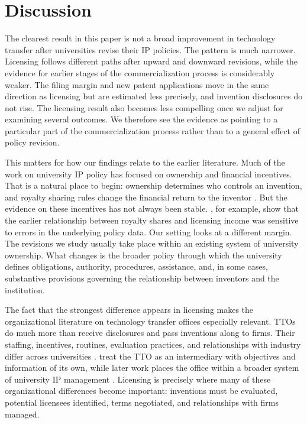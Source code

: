 \section{Discussion}\label{sec:discussion}

The clearest result in this paper is not a broad improvement in technology transfer after universities revise their IP policies. The pattern is much narrower. Licensing follows different paths after upward and downward revisions, while the evidence for earlier stages of the commercialization process is considerably weaker. The filing margin and new patent applications move in the same direction as licensing but are estimated less precisely, and invention disclosures do not rise. The licensing result also becomes less compelling once we adjust for examining several outcomes. We therefore see the evidence as pointing to a particular part of the commercialization process rather than to a general effect of policy revision.

This matters for how our findings relate to the earlier literature. Much of the work on university IP policy has focused on ownership and financial incentives. That is a natural place to begin: ownership determines who controls an invention, and royalty sharing rules change the financial return to the inventor \citep{HvideJones2018,KenneyPatton2009,LachSchankerman2008,ArqueCastellsEtAl2016}. But the evidence on these incentives has not always been stable. \citet{OuelletteTutt2020}, for example, show that the earlier relationship between royalty shares and licensing income was sensitive to errors in the underlying policy data. Our setting looks at a different margin. The revisions we study usually take place within an existing system of university ownership. What changes is the broader policy through which the university defines obligations, authority, procedures, assistance, and, in some cases, substantive provisions governing the relationship between inventors and the institution.

The fact that the strongest difference appears in licensing makes the organizational literature on technology transfer offices especially relevant. TTOs do much more than receive disclosures and pass inventions along to firms. Their staffing, incentives, routines, evaluation practices, and relationships with industry differ across universities \citep{ThursbyKemp2002,SiegelWaldmanLink2003,MarkmanEtAl2005,DebackereVeugelers2005}. \citet{JensenThursbyThursby2003} treat the TTO as an intermediary with objectives and information of its own, while later work places the office within a broader system of university IP management \citep{HolgerssonEtAl2019,AaboenHolgersson2019}. Licensing is precisely where many of these organizational differences become important: inventions must be evaluated, potential licensees identified, terms negotiated, and relationships with firms managed.

